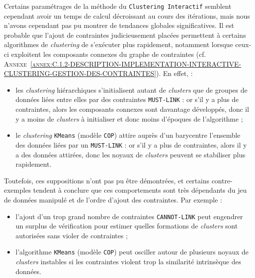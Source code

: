 			\begin{leftBarAuthorOpinion}
				Certains paramétrages de la méthode du \texttt{Clustering Interactif} semblent cependant avoir un temps de calcul décroissant au cours des itérations, mais nous n'avons cependant pas pu montrer de tendances globales significatives.
				Il est probable que l'ajout de contraintes judicieusement placées permettent à certains algorithmes de \textit{clustering} de s'exécuter plus rapidement, notamment lorsque ceux-ci exploitent les composants connexes du graphe de contraintes (cf. \textsc{Annexe~\ref{annex:C.1.2-DESCRIPTION-IMPLEMENTATION-INTERACTIVE-CLUSTERING-GESTION-DES-CONTRAINTES}}).
				En effet, :
				\begin{itemize}
					\item les \textit{clustering} hiérarchiques s'initialisent autant de \textit{clusters} que de groupes de données liées entre elles par des contraintes \texttt{MUST-LINK} : or s'il y a plus de contraintes, alors les composants connexes sont davantage développés, donc il y a moins de \textit{clusters} à initialiser et donc moins d'époques de l'algorithme ;
					\item le \textit{clustering} \texttt{KMeans} (modèle \texttt{COP}) attire auprès d'un barycentre l'ensemble des données liées par un \texttt{MUST-LINK} : or s'il y a plus de contraintes, alors il y a des données attirées, donc les noyaux de \textit{clusters} peuvent se stabiliser plus rapidement.  
				\end{itemize}
				Toutefois, ces suppositions n'ont pas pu être démontrées, et certains contre-exemples tendent à conclure que ces comportements sont très dépendants du jeu de données manipulé et de l'ordre d'ajout des contraintes. Par exemple :
				\begin{itemize}
					\item l'ajout d'un trop grand nombre de contraintes \texttt{CANNOT-LINK} peut engendrer un surplus de vérification pour estimer quelles formations de \textit{clusters} sont autorisées sans violer de contraintes ;
					\item l'algorithme \texttt{KMeans} (modèle \texttt{COP}) peut osciller autour de plusieurs noyaux de \textit{clusters} instables si les contraintes violent trop la similarité intrinsèque des données.
				\end{itemize}
			\end{leftBarAuthorOpinion}
			
